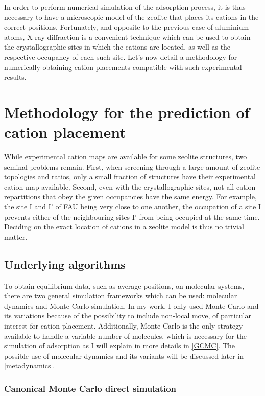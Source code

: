 \documentclass[main.tex]{subfiles}
\begin{document}
In order to perform numerical simulation of the adsorption process, it is thus necessary to have a microscopic model of the zeolite that places its cations in the correct positions. Fortunately, and opposite to the previous case of aluminium atoms, X-ray diffraction is a convenient technique which can be used to obtain the crystallographic sites in which the cations are located, as well as the respective occupancy of each such site. Let's now detail a methodology for numerically obtaining cation placements compatible with such experimental results.

\section{Methodology for the prediction of cation placement}

While experimental cation maps are available for some zeolite structures, two seminal problems remain. First, when screening through a large amount of zeolite topologies and \SiAl ratios, only a small fraction of structures have their experimental cation map available. Second, even with the crystallographic sites, not all cation repartitions that obey the given occupancies have the same energy. For example, the site I and I' of FAU being very close to one another, the occupation of a site I prevents either of the neighbouring sites I' from being occupied at the same time. Deciding on the exact location of cations in a zeolite model is thus no trivial matter.

\subsection{Underlying algorithms}

To obtain equilibrium data, such as average positions, on molecular systems, there are two general simulation frameworks which can be used: molecular dynamics and Monte Carlo simulation. In my work, I only used Monte Carlo and its variations because of the possibility to include non-local move, of particular interest for cation placement. Additionally, Monte Carlo is the only strategy available to handle a variable number of molecules, which is necessary for the simulation of adsorption as I will explain in more details in \cref{GCMC}. The possible use of molecular dynamics and its variants will be discussed later in \cref{metadynamics}.

\subsubsection{Canonical Monte Carlo direct simulation}
\end{document}

